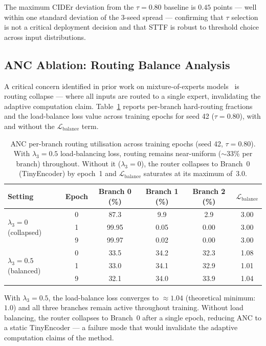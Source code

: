 \documentclass{article}
\begin{document}
The maximum CIDEr deviation from the $\tau{=}0.80$ baseline is $0.45$ points --- well within one standard deviation of the 3-seed spread --- confirming that $\tau$ selection is not a critical deployment decision and that STTF is robust to threshold choice across input distributions.



\subsection{ANC Ablation: Routing Balance Analysis}

A critical concern identified in prior work on mixture-of-experts models~\cite{fedus2022switch} is routing collapse --- where all inputs are routed to a single expert, invalidating the adaptive computation claim.
Table~\ref{tab:anc_routing} reports per-branch hard-routing fractions and the load-balance loss value across training epochs for seed 42 ($\tau{=}0.80$), with and without the $\mathcal{L}_{\text{balance}}$ term.

\begin{table}[htbp]
\centering
\caption{ANC per-branch routing utilisation across training epochs (seed 42, $\tau{=}0.80$). With $\lambda_3{=}0.5$ load-balancing loss, routing remains near-uniform ($\sim$33\% per branch) throughout. Without it ($\lambda_3{=}0$), the router collapses to Branch~0 (TinyEncoder) by epoch~1 and $\mathcal{L}_{\text{balance}}$ saturates at its maximum of~3.0.}
\label{tab:anc_routing}
\begin{tabular}{lccccc}
\toprule
Setting & Epoch & Branch 0 (\%) & Branch 1 (\%) & Branch 2 (\%) & $\mathcal{L}_{\text{balance}}$ \\
\midrule
\multirow{3}{*}{$\lambda_3=0$ (collapsed)} & 0 & 87.3 & 9.9 & 2.9 & 3.00 \\
 & 1 & 99.95 & 0.05 & 0.00 & 3.00 \\
 & 9 & 99.97 & 0.02 & 0.00 & 3.00 \\
\midrule
\multirow{3}{*}{$\lambda_3=0.5$ (balanced)} & 0 & 33.5 & 34.2 & 32.3 & 1.08 \\
 & 1 & 33.0 & 34.1 & 32.9 & 1.01 \\
 & 9 & 32.1 & 34.0 & 33.9 & 1.04 \\
\bottomrule
\end{tabular}
\end{table}

With $\lambda_3{=}0.5$, the load-balance loss converges to $\approx 1.04$ (theoretical minimum: $1.0$) and all three branches remain active throughout training.
Without load balancing, the router collapses to Branch~0 after a single epoch, reducing ANC to a static TinyEncoder --- a failure mode that would invalidate the adaptive computation claims of the method.
\end{document}
